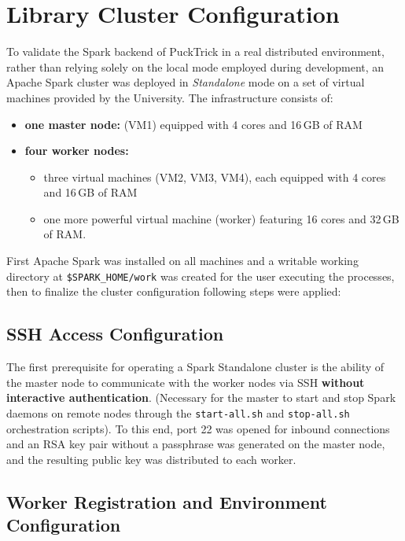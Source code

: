 \documentclass[../main.tex]{subfiles}
\begin{document}
\newpage
\section{Library Cluster Configuration}
\label{sec:Library_clusert_config}

To validate the Spark backend of PuckTrick in a real distributed environment, rather than relying solely on the local mode employed during development, an Apache Spark cluster was deployed in \emph{Standalone} mode on a set of virtual machines provided by the University. The infrastructure consists of:
\begin{itemize}
    \item \textbf{one master node:} (VM1) equipped with 4 cores and 16\,GB of RAM
    \item \textbf{four worker nodes:} 
        \begin{itemize}
            \item three virtual machines (VM2, VM3, VM4), each equipped with 4 cores and 16\,GB of RAM
            \item one more powerful virtual machine (worker) featuring 16 cores and 32\,GB of RAM.
        \end{itemize}
\end{itemize}
First Apache Spark was installed on all machines and a writable working directory at \texttt{\$SPARK\_HOME/work} was created for the user executing the processes, then to finalize the cluster configuration following steps were applied:

\subsection{SSH Access Configuration}

The first prerequisite for operating a Spark Standalone cluster is the ability of the master node to communicate with the worker nodes via SSH \textbf{without interactive authentication}. (Necessary for the master to start and stop Spark daemons on remote nodes through the \texttt{start-all.sh} and \texttt{stop-all.sh} orchestration scripts). To this end, port 22 was opened for inbound connections and an RSA key pair without a passphrase was generated on the master node, and the resulting public key was distributed to each worker.


\subsection{Worker Registration and Environment Configuration}
\end{document}
